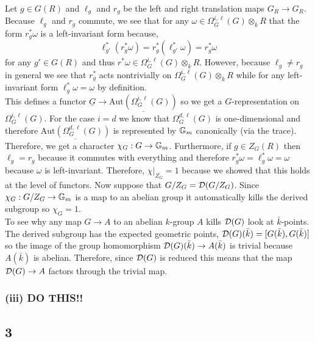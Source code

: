 \documentclass[12pt]{article}
\begin{document}
Let $g \in G(R)$ and $\ell_g$ and $r_g$ be the left and right translation maps $G_R \to G_R$. Because $\ell_g$ and $r_g$ commute, we see that for any $\omega \in \Omega^{i, \ell}_{G}(G) \otimes_k R$ that the form $r_g^* \omega$ is a left-invariant form because,
\[ \ell_{g'}^* (r_g^* \omega) = r_g^* (\ell_{g'}^* \omega) = r_g^* \omega \]
for any $g' \in G(R)$ and thus $r^* \omega \in \Omega^{i, \ell}_{G}(G) \otimes_k R$. However, because $\ell_g \neq r_g$ in general we see that $r_g^*$ acts nontrivially on $\Omega^{i, \ell}_{G}(G) \otimes_k R$ while for any left-invariant form $\ell_g^* \omega = \omega$ by definition. 
\bigskip\\
This defines a functor $\underline{G} \to \underline{\mathrm{Aut}(\Omega^{i, \ell}_{G}(G))}$ so we get a $G$-representation on $\Omega^{i, \ell}_{G}(G)$. For the case $i = d$ we know that $\Omega^{d, \ell}_G(G)$ is one-dimensional and therefore $\underline{\mathrm{Aut}(\Omega^{d, \ell}_{G}(G))}$ is represented by $\mathbb{G}_m$ canonically (via the trace). Therefore, we get a character $\chi_G : G \to \mathbb{G}_m$. Furthermore, if $g \in Z_G(R)$ then $\ell_g = r_g$ because it commutes with everything and therefore $r_g^* \omega = \ell_g^* \omega = \omega$ because $\omega$ is left-invariant. Therefore, $\chi|_{Z_G} = 1$ because we showed that this holds at the level of functors. Now suppose that $G / Z_G = \mathcal{D}(G/Z_G)$. Since $\chi_G : G / Z_G \to \mathbb{G}_m$ is a map to an abelian group it automatically kills the derived subgroup so $\chi_G = 1$.
\bigskip\\
To see why any map $G \to A$ to an abelian $k$-group $A$ kills $\mathcal{D}(G)$ look at $\bar{k}$-points. The derived subgroup has the expected geometric points, $\mathcal{D}(G)(\bar{k}) = [G(\bar{k}), G(\bar{k})]$ so the image of the group homomorphism $\mathcal{D}(G)(\bar{k}) \to A(\bar{k})$ is trivial because $A(\bar{k})$ is abelian. Therefore, since $\mathcal{D}(G)$ is reduced this means that the map $\mathcal{D}(G) \to A$ factors through the trivial map.

\subsubsection{(iii) DO THIS!!}

\subsection{3}
\end{document}
